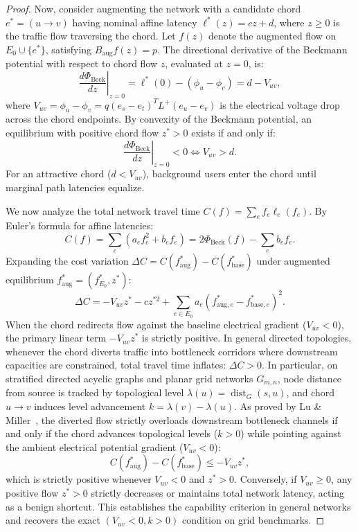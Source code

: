 \documentclass[11pt,a4paper]{article}
\begin{document}
\begin{proof}
Now, consider augmenting the network with a candidate chord $e^* = (u \to v)$ having nominal affine latency $\ell^*(z) = c z + d$, where $z \ge 0$ is the traffic flow traversing the chord. Let $f(z)$ denote the augmented flow on $E_0 \cup \{e^*\}$, satisfying $B_{\text{aug}} f(z) = p$. The directional derivative of the Beckmann potential with respect to chord flow $z$, evaluated at $z = 0$, is:
\begin{equation}
\left. \frac{d \Phi_{\text{Beck}}}{dz} \right|_{z=0} = \ell^*(0) - (\phi_u - \phi_v) = d - V_{uv},
\end{equation}
where $V_{uv} = \phi_u - \phi_v = q (e_s - e_t)^T L^+ (e_u - e_v)$ is the electrical voltage drop across the chord endpoints. By convexity of the Beckmann potential, an equilibrium with positive chord flow $z^* > 0$ exists if and only if:
\begin{equation}
\left. \frac{d \Phi_{\text{Beck}}}{dz} \right|_{z=0} < 0 \iff V_{uv} > d.
\end{equation}
For an attractive chord ($d < V_{uv}$), background users enter the chord until marginal path latencies equalize.

We now analyze the total network travel time $C(f) = \sum_{e} f_e \ell_e(f_e)$. By Euler's formula for affine latencies:
\begin{equation}
C(f) = \sum_e (a_e f_e^2 + b_e f_e) = 2 \Phi_{\text{Beck}}(f) - \sum_e b_e f_e.
\end{equation}
Expanding the cost variation $\Delta C = C(f_{\text{aug}}^*) - C(f_{\text{base}}^*)$ under augmented equilibrium $f_{\text{aug}}^* = (f_{E_0}^*, z^*)$:
\begin{equation}
\Delta C = -V_{uv} z^* - c z^{*2} + \sum_{e \in E_0} a_e (f_{\text{aug}, e}^* - f_{\text{base}, e}^*)^2.
\end{equation}
When the chord redirects flow against the baseline electrical gradient ($V_{uv} < 0$), the primary linear term $-V_{uv} z^*$ is strictly positive. In general directed topologies, whenever the chord diverts traffic into bottleneck corridors where downstream capacities are constrained, total travel time inflates: $\Delta C > 0$. In particular, on stratified directed acyclic graphs and planar grid networks $G_{m,n}$, node distance from source is tracked by topological level $\lambda(u) = \operatorname{dist}_G(s, u)$, and chord $u \to v$ induces level advancement $k = \lambda(v) - \lambda(u)$. As proved by Lu \& Miller~\cite{lu2026braess}, the diverted flow strictly overloads downstream bottleneck channels if and only if the chord advances topological levels ($k > 0$) while pointing against the ambient electrical potential gradient ($V_{uv} < 0$):
\begin{equation}
C(f_{\text{aug}}^*) - C(f_{\text{base}}^*) \le -V_{uv} z^*,
\end{equation}
which is strictly positive whenever $V_{uv} < 0$ and $z^* > 0$. Conversely, if $V_{uv} \ge 0$, any positive flow $z^* > 0$ strictly decreases or maintains total network latency, acting as a benign shortcut. This establishes the capability criterion in general networks and recovers the exact $(V_{uv} < 0, k > 0)$ condition on grid benchmarks.
\end{proof}
\end{document}

